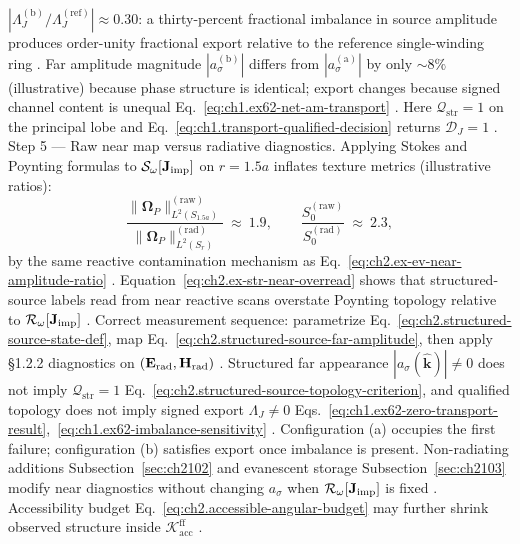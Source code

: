 \(|\Lambda_J^{(\mathrm{b})}/\Lambda_J^{(\mathrm{ref})}|\approx 0.30\): a thirty-percent fractional
imbalance in source amplitude produces order-unity fractional export relative to the reference
single-winding ring \cite{stratton1941}. Far amplitude magnitude
\(|a_\sigma^{(\mathrm{b})}|\) differs from \(|a_\sigma^{(\mathrm{a})}|\) by only
\(\sim 8\%\) (illustrative) because phase structure is identical; export changes because signed channel content
is unequal Eq.~\eqref{eq:ch1.ex62-net-am-transport} \cite{stratton1941}. Here
\(\mathcal{Q}_{\mathrm{str}}=1\) on the principal lobe and
Eq.~\eqref{eq:ch1.transport-qualified-decision} returns \(\mathcal{D}_J=1\)
\cite{stratton1941}. Step 5 — Raw near map versus radiative diagnostics. Applying Stokes and Poynting formulas to \(\mathcal{S}_\omega[\mathbf{J}_{\mathrm{imp}}]\) on \(r=1.5a\) inflates
texture metrics (illustrative ratios):
\begin{equation}
\label{eq:ch2.ex-str-near-overread}
\frac{\|\boldsymbol{\Omega}_P\|_{L^{2}(S_{1.5a})}^{(\mathrm{raw})}}
 {\|\boldsymbol{\Omega}_P\|_{L^{2}(S_r)}^{(\mathrm{rad})}}
\ \approx\ 1.9,
\qquad
\frac{S_0^{(\mathrm{raw})}}{S_0^{(\mathrm{rad})}}
\ \approx\ 2.3,
\end{equation}
by the same reactive contamination mechanism as Eq.~\eqref{eq:ch2.ex-ev-near-amplitude-ratio}
\cite{stratton1941}. Equation~\eqref{eq:ch2.ex-str-near-overread} shows that
structured-source labels read from near reactive scans overstate Poynting topology relative to
\(\mathcal{R}_\omega[\mathbf{J}_{\mathrm{imp}}]\) \cite{stratton1941}. Correct measurement sequence: parametrize
Eq.~\eqref{eq:ch2.structured-source-state-def}, map
Eq.~\eqref{eq:ch2.structured-source-far-amplitude}, then apply §1.2.2 diagnostics on
\((\mathbf{E}_{\mathrm{rad}},\mathbf{H}_{\mathrm{rad}})\) \cite{harrington2001}.
Structured far appearance \(|a_\sigma(\widehat{\mathbf{k}})|\neq 0\) does not imply
\(\mathcal{Q}_{\mathrm{str}}=1\) Eq.~\eqref{eq:ch2.structured-source-topology-criterion}, and qualified
topology does not imply signed export \(\Lambda_J\neq 0\)
Eqs.~\eqref{eq:ch1.ex62-zero-transport-result},~\eqref{eq:ch1.ex62-imbalance-sensitivity}
\cite{stratton1941}. Configuration (a) occupies the first failure;
configuration (b) satisfies export once imbalance is present. Non-radiating additions
Subsection~\ref{sec:ch2102} and evanescent storage Subsection~\ref{sec:ch2103} modify near
diagnostics without changing \(a_\sigma\) when \(\mathcal{R}_\omega[\mathbf{J}_{\mathrm{imp}}]\) is fixed
\cite{stratton1941}. Accessibility budget
Eq.~\eqref{eq:ch2.accessible-angular-budget} may further shrink observed structure inside
\(\mathcal{K}_{\mathrm{acc}}^{\mathrm{ff}}\) \cite{stratton1941}.
